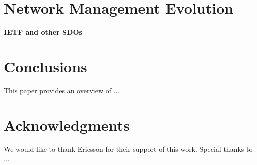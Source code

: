 \documentclass[11pt,sigconf]{iabart}
\begin{document}
\section{Network Management Evolution} \label{insights}






\textbf{IETF and other SDOs}




\section{Conclusions} \label{conclusions}

This paper provides an overview of ...

\section{Acknowledgments}

We would like to thank Ericsson for their support of this work. Special thanks to ...



\end{document}
